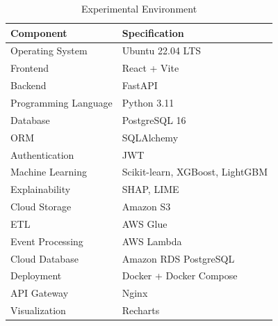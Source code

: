 \documentclass[conference]{IEEEtran}
\begin{document}
\begin{table}[H]

\centering

\caption{Experimental Environment}

\label{tab:environment}

\begin{tabular}{ll}

\toprule

Component & Specification \\

\midrule

Operating System & Ubuntu 22.04 LTS \\

Frontend & React + Vite \\

Backend & FastAPI \\

Programming Language & Python 3.11 \\

Database & PostgreSQL 16 \\

ORM & SQLAlchemy \\

Authentication & JWT \\

Machine Learning & Scikit-learn, XGBoost, LightGBM \\

Explainability & SHAP, LIME \\

Cloud Storage & Amazon S3 \\

ETL & AWS Glue \\

Event Processing & AWS Lambda \\

Cloud Database & Amazon RDS PostgreSQL \\

Deployment & Docker + Docker Compose \\

API Gateway & Nginx \\

Visualization & Recharts \\

\bottomrule

\end{tabular}

\end{table}
\end{document}
